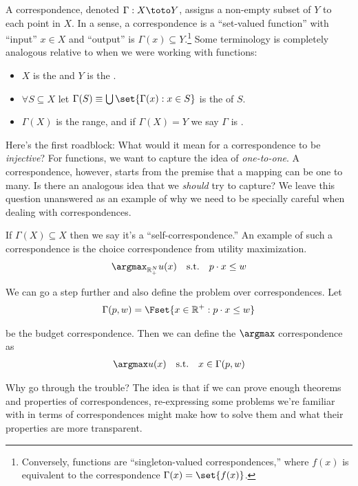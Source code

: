 \documentclass{article}
\begin{document}
A correspondence, denoted $\Gamma: X \toto Y$, assigns a non-empty subset of $Y$ to each point in $X$. In a sense, a correspondence is a ``set-valued function'' with ``input'' $x \in X$ and ``output'' is $\Gamma(x) \subseteq Y$.\footnote{Conversely, functions are ``singleton-valued correspondences,'' where $f(x)$ is equivalent to the correspondence $\Gamma(x) = \set{f(x)}$.} Some terminology is completely analogous relative to when we were working with functions:
\begin{itemize}[label=$\bullet$]
  \item $X$ is the  and $Y$ is the .

  \item $\forall S \subseteq X$ let $\Gamma(S) \equiv \bigcup\set{\Gamma(x): x \in S}$ is the  of $S$.

  \item $\Gamma(X)$ is the range, and if $\Gamma(X) = Y$ we say $\Gamma$ is .
\end{itemize}

Here's the first roadblock: What would it mean for a correspondence to be \textit{injective}? For functions, we want to capture the idea of \textit{one-to-one}. A correspondence, however, starts from the premise that a mapping can be one to many. Is there an analogous idea that we \textit{should} try to capture? We leave this question unanswered as an example of why we need to be specially careful when dealing with correspondences.
\begin{example}
  If $\Gamma(X) \subseteq X$ then we say it's a ``self-correspondence.'' An example of such a correspondence is the choice correspondence from utility maximization.
  \begin{align*}
    \argmax_{\mathbb{R}^N_+} u(x)
    \quad
    \text{s.t.}
    \quad
    p \cdot x \le w
  \end{align*}

  We can go a step further and also define the problem over correspondences. Let
  \begin{align*}
    \Gamma(p, w)
    =
    \Fset{x \in \mathbb{R}^+: p \cdot x \le w}
  \end{align*}

  be the budget correspondence. Then we can define the $\argmax$ correspondence as
  \begin{align*}
    \argmax u(x)
    \quad
    \text{s.t.}
    \quad
    x \in \Gamma(p, w)
  \end{align*}

  Why go through the trouble? The idea is that if we can prove enough theorems and properties of correspondences, re-expressing some problems we're familiar with in terms of correspondences might make how to solve them and what their properties are more transparent.
\end{example}
\end{document}

